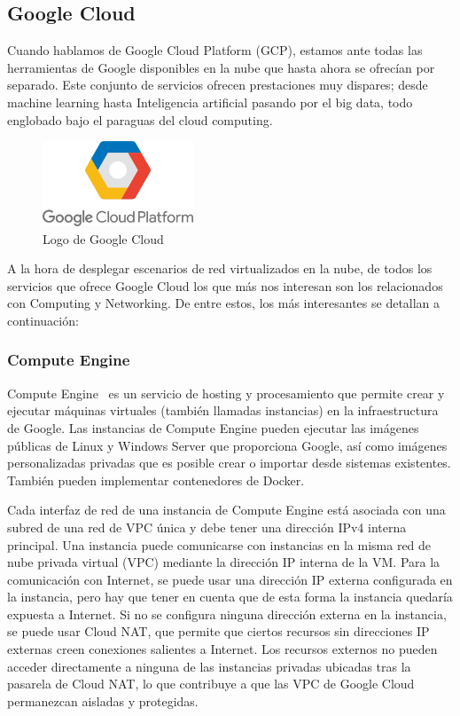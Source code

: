 \subsection{Google Cloud}
    Cuando hablamos de Google Cloud Platform (GCP), estamos ante todas las herramientas de Google disponibles en la nube que hasta ahora se ofrecían por separado. Este conjunto de servicios ofrecen prestaciones muy dispares; desde machine learning hasta Inteligencia artificial pasando por el big data, todo englobado bajo el paraguas del cloud computing.

    \begin{figure}[h]
    \centering
    \includegraphics[width=0.4\textwidth]{../imgs/EdA/gcloud-logo.png}
    \caption{Logo de Google Cloud}
    \label{fig:gcloud}
    \end{figure}

    A la hora de desplegar escenarios de red virtualizados en la nube, de todos los servicios que ofrece Google Cloud los que más nos interesan son los relacionados con Computing y Networking. De entre estos, los más interesantes se detallan a continuación:

\subsubsection{Compute Engine}
    Compute Engine~\cite{cloud2} es un servicio de hosting y procesamiento que permite crear y ejecutar máquinas virtuales (también llamadas instancias) en la infraestructura de Google. Las instancias de Compute Engine pueden ejecutar las imágenes públicas de Linux y Windows Server que proporciona Google, así como imágenes personalizadas privadas que es posible crear o importar desde sistemas existentes. También pueden implementar contenedores de Docker.

    Cada interfaz de red de una instancia de Compute Engine está asociada con una subred de una red de VPC única y debe tener una dirección IPv4 interna principal. Una instancia puede comunicarse con instancias en la misma red de nube privada virtual (VPC) mediante la dirección IP interna de la VM. Para la comunicación con Internet, se puede usar una dirección IP externa configurada en la instancia, pero hay que tener en cuenta que de esta forma la instancia quedaría expuesta a Internet. Si no se configura ninguna dirección externa en la instancia, se puede usar Cloud NAT, que permite que ciertos recursos sin direcciones IP externas creen conexiones salientes a Internet. Los recursos externos no pueden acceder directamente a ninguna de las instancias privadas ubicadas tras la pasarela de Cloud NAT, lo que contribuye a que las VPC de Google Cloud permanezcan aisladas y protegidas.

